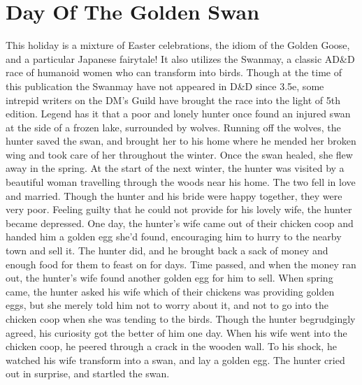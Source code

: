 \documentclass[10pt,a4paper,twoside,bg=print,twocolumn,openany,nodeprecatedcode]{dndbook}
\begin{document}
\section{Day Of The Golden Swan}
This holiday is a mixture of Easter celebrations, the idiom of the Golden Goose, and a particular Japanese fairytale! It also utilizes the Swanmay, a classic AD\&D race of humanoid women who can transform into birds. Though at the time of this publication the Swanmay have not appeared in D\&D since 3.5e, some intrepid writers on the DM's Guild have brought the race into the light of 5th edition. Legend has it that a poor and lonely hunter once found an injured swan at the side of a frozen lake, surrounded by wolves. Running off the wolves, the hunter saved the swan, and brought her to his home where he mended her broken wing and took care of her throughout the winter. Once the swan healed, she flew away in the spring. At the start of the next winter, the hunter was visited by a beautiful woman travelling through the woods near his home. The two fell in love and married. Though the hunter and his bride were happy together, they were very poor. Feeling guilty that he could not provide for his lovely wife, the hunter became depressed. One day, the hunter's wife came out of their chicken coop and handed him a golden egg she'd found, encouraging him to hurry to the nearby town and sell it. The hunter did, and he brought back a sack of money and enough food for them to feast on for days. Time passed, and when the money ran out, the hunter's wife found another golden egg for him to sell. When spring came, the hunter asked his wife which of their chickens was providing golden eggs, but she merely told him not to worry about it, and not to go into the chicken coop when she was tending to the birds. Though the hunter begrudgingly agreed, his curiosity got the better of him one day. When his wife went into the chicken coop, he peered through a crack in the wooden wall. To his shock, he watched his wife transform into a swan, and lay a golden egg. The hunter cried out in surprise, and startled the swan.
\end{document}
